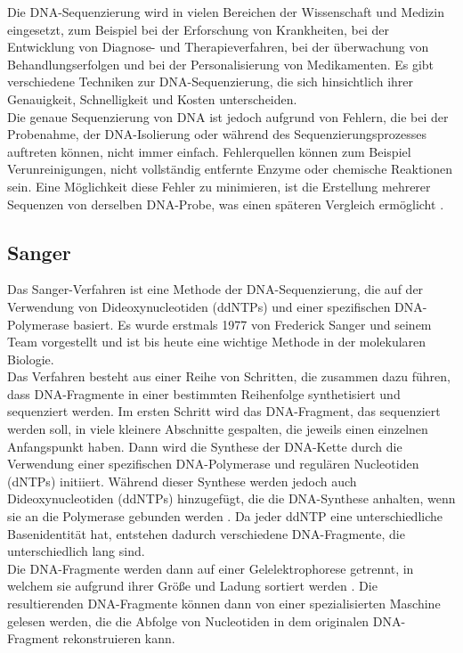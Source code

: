 \documentclass[oneside,bibliography=totocnumbered,BCOR=5mm]{scrbook}%
\theoremstyle{definition}
\theoremstyle{definition}
\theoremstyle{definition}
\theoremstyle{definition}
\theoremstyle{definition}
\theoremstyle{definition}
\begin{document}
Die DNA-Sequenzierung wird in vielen Bereichen der Wissenschaft und Medizin eingesetzt, 
zum Beispiel bei der Erforschung von Krankheiten, bei der Entwicklung von Diagnose- und Therapieverfahren, 
bei der überwachung von Behandlungserfolgen und bei der Personalisierung von Medikamenten. 
Es gibt verschiedene Techniken zur DNA-Sequenzierung, die sich hinsichtlich ihrer Genauigkeit, 
Schnelligkeit und Kosten unterscheiden. \\


Die genaue Sequenzierung von DNA ist jedoch aufgrund von Fehlern, die bei der Probenahme, 
der DNA-Isolierung oder während des Sequenzierungsprozesses auftreten können, 
nicht immer einfach. 
Fehlerquellen können zum Beispiel Verunreinigungen, nicht vollständig entfernte Enzyme oder chemische Reaktionen sein. 
Eine Möglichkeit diese Fehler zu minimieren, ist die Erstellung mehrerer Sequenzen von derselben DNA-Probe, 
was einen späteren Vergleich ermöglicht \autocite{dnaReplicants}.


\subsection{Sanger}

Das Sanger-Verfahren ist eine Methode der DNA-Sequenzierung, 
die auf der Verwendung von Dideoxynucleotiden (ddNTPs) und einer spezifischen DNA-Polymerase basiert. 
Es wurde erstmals 1977 von Frederick Sanger und seinem Team vorgestellt und ist bis heute eine wichtige Methode 
in der molekularen Biologie. \\


Das Verfahren besteht aus einer Reihe von Schritten, die zusammen dazu führen, 
dass DNA-Fragmente in einer bestimmten Reihenfolge synthetisiert und sequenziert werden. 
Im ersten Schritt wird das DNA-Fragment, das sequenziert werden soll, in viele kleinere Abschnitte gespalten, 
die jeweils einen einzelnen Anfangspunkt haben. Dann wird die Synthese der DNA-Kette durch die Verwendung 
einer spezifischen DNA-Polymerase und regulären Nucleotiden (dNTPs) initiiert. 
Während dieser Synthese werden jedoch auch Dideoxynucleotiden (ddNTPs) hinzugefügt, die die DNA-Synthese anhalten, 
wenn sie an die Polymerase gebunden werden \autocite[Seite 2]{metzker2005}. 
Da jeder ddNTP eine unterschiedliche Basenidentität hat, entstehen dadurch verschiedene DNA-Fragmente, 
die unterschiedlich lang sind. \\


Die DNA-Fragmente werden dann auf einer Gelelektrophorese getrennt, 
in welchem sie aufgrund ihrer Größe und Ladung sortiert werden \autocite[Seite 2]{metzker2005}. 
Die resultierenden DNA-Fragmente können dann von einer spezialisierten Maschine gelesen werden, 
die die Abfolge von Nucleotiden in dem originalen DNA-Fragment rekonstruieren kann. \\
\end{document}
